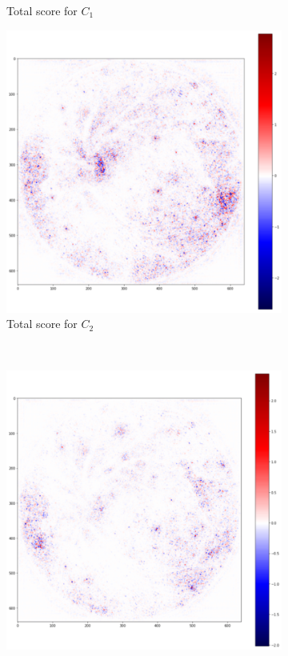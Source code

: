 \documentclass[preprint]{elsarticle}
\theoremstyle{definition} %
\theoremstyle{remark}
\begin{document}
\begin{figure}[h!]
\begin{subfigure}[b]{0.43\textwidth}
		\caption{Total score for $C_1$}
		\label{fig:score_total_c1}
	\end{subfigure}
	\begin{subfigure}[b]{0.43\textwidth}
		\includegraphics[width=\textwidth]{figures/score_prop_23713_left/score_total_c2.png}
		\caption{Total score for $C_2$}
		\label{fig:score_total_c2}
	\end{subfigure}~
	\begin{subfigure}[b]{0.43\textwidth}
		\includegraphics[width=\textwidth]{figures/score_prop_23713_left/score_total_c3.png}

\end{subfigure}
\end{figure}
\end{document}
